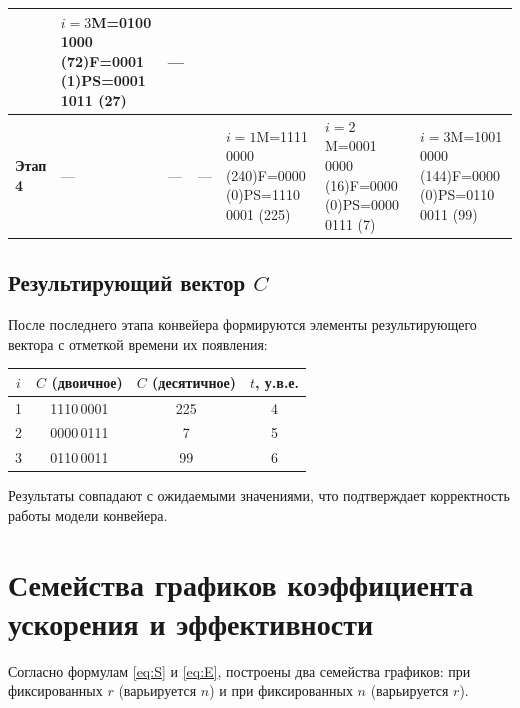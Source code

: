 \documentclass[12pt,a4paper]{article}
\begin{document}
\begin{landscape}
\begin{table}[h!]
\begin{tabular}{|l|p{3.1cm}|p{3.1cm}|p{3.1cm}|p{3.1cm}|p{3.1cm}|p{3.1cm}|}
 & $i{=}3$\newline M=0100\,1000 (72)\newline F=0001 (1)\newline PS=0001\,1011 (27)
 & --- \\
\hline
\textbf{Этап 4}
 & ---
 & ---
 & ---
 & $i{=}1$\newline M=1111\,0000 (240)\newline F=0000 (0)\newline PS=1110\,0001 (225)
 & $i{=}2$\newline M=0001\,0000 (16)\newline F=0000 (0)\newline PS=0000\,0111 (7)
 & $i{=}3$\newline M=1001\,0000 (144)\newline F=0000 (0)\newline PS=0110\,0011 (99) \\
\hline
\end{tabular}
\end{table}
\end{landscape}

\subsection{Результирующий вектор $C$}

После последнего этапа конвейера формируются элементы
результирующего вектора с отметкой времени их появления:
\begin{center}
\begin{tabular}{c|c|c|c}
\toprule
$i$ & $C$ (двоичное) & $C$ (десятичное) & $t$, у.в.е. \\
\midrule
1 & 1110\,0001 & 225 & 4 \\
2 & 0000\,0111 &   7 & 5 \\
3 & 0110\,0011 &  99 & 6 \\
\bottomrule
\end{tabular}
\end{center}

Результаты совпадают с ожидаемыми значениями, что подтверждает
корректность работы модели конвейера.

\section{Семейства графиков коэффициента ускорения и эффективности}

Согласно формулам \eqref{eq:S} и \eqref{eq:E}, построены два
семейства графиков: при фиксированных $r$ (варьируется $n$) и
при фиксированных $n$ (варьируется $r$).
\end{document}
